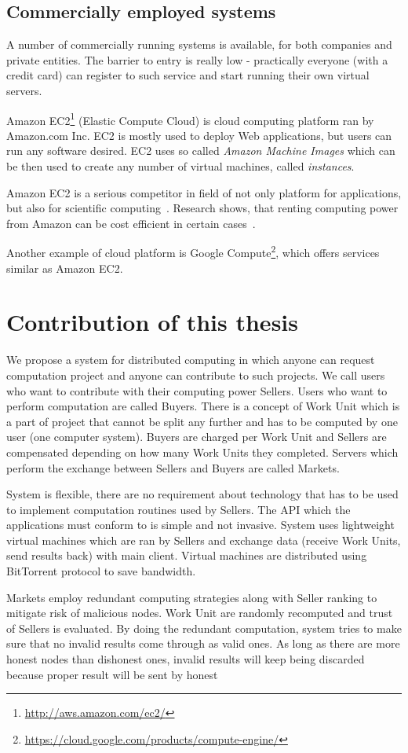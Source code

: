 \subsection{Commercially employed systems}
\label{s:comercial_sys}

A number of commercially running systems is available, for both companies and private entities. The barrier to entry is really low - practically everyone (with a credit card) can register to such service and start running their own virtual servers.

Amazon EC2\footnote{\url{http://aws.amazon.com/ec2/}} (Elastic Compute Cloud) is cloud computing platform ran by Amazon.com Inc. EC2 is mostly used to deploy Web applications, but users can run any software desired. EC2 uses so called \emph{Amazon Machine Images} which can be then used to create any number of virtual machines, called \emph{instances}.

Amazon EC2 is a serious competitor in field of not only platform for applications, but also for scientific computing~\cite{walker2008benchmarking}. Research shows, that renting computing power from Amazon can be cost efficient in certain cases~\cite{berriman2013application}.

Another example of cloud platform is Google Compute\footnote{\url{https://cloud.google.com/products/compute-engine/}}, which offers services similar as Amazon EC2.

\section{Contribution of this thesis}

We propose a system for distributed computing in which anyone can request computation project and anyone can contribute to such projects. We call users who want to contribute with their computing power Sellers. Users who want to perform computation are called Buyers. There is a concept of Work Unit which is a part of project that cannot be split any further and has to be computed by one user (one computer system). Buyers are charged per Work Unit and Sellers are compensated depending on how many Work Units they completed. Servers which perform the exchange between Sellers and Buyers are called Markets.

System is flexible, there are no requirement about technology that has to be used to implement computation routines used by Sellers. The API which the applications must conform to is simple and not invasive. System uses lightweight virtual machines which are ran by Sellers and exchange data (receive Work Units, send results back) with main client. Virtual machines are distributed using BitTorrent protocol to save bandwidth.

Markets employ redundant computing strategies along with Seller ranking to mitigate risk of malicious nodes. Work Unit are randomly recomputed and trust of Sellers is evaluated. By doing the redundant computation, system tries to make sure that no invalid results come through as valid ones. As long as there are more honest nodes than dishonest ones, invalid results will keep being discarded because proper result will be sent by honest
